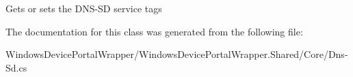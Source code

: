 Gets or sets the D\+N\+S-\/\+SD service tags 



The documentation for this class was generated from the following file\+:\begin{DoxyCompactItemize}
\item 
Windows\+Device\+Portal\+Wrapper/\+Windows\+Device\+Portal\+Wrapper.\+Shared/\+Core/Dns-\/\+Sd.\+cs\end{DoxyCompactItemize}

